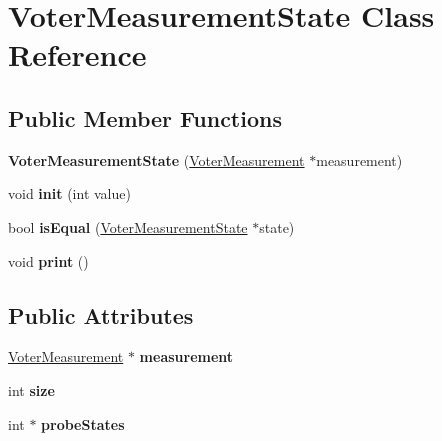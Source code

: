 \hypertarget{class_voter_measurement_state}{\section{Voter\-Measurement\-State Class Reference}
\label{class_voter_measurement_state}
}
\subsection*{Public Member Functions}
\begin{DoxyCompactItemize}
\item 
\hypertarget{class_voter_measurement_state_a35147598e984c9f124284ce82ef1c63a}{{\bfseries Voter\-Measurement\-State} (\hyperlink{class_voter_measurement}{Voter\-Measurement} $\ast$measurement)}\label{class_voter_measurement_state_a35147598e984c9f124284ce82ef1c63a}

\item 
\hypertarget{class_voter_measurement_state_a0e42569bb960b755395b5eec5b928014}{void {\bfseries init} (int value)}\label{class_voter_measurement_state_a0e42569bb960b755395b5eec5b928014}

\item 
\hypertarget{class_voter_measurement_state_ace14af99c55124ee7a4199c1f2d44b9c}{bool {\bfseries is\-Equal} (\hyperlink{class_voter_measurement_state}{Voter\-Measurement\-State} $\ast$state)}\label{class_voter_measurement_state_ace14af99c55124ee7a4199c1f2d44b9c}

\item 
\hypertarget{class_voter_measurement_state_aa40e89eeb334efa48cba9afaf8aec269}{void {\bfseries print} ()}\label{class_voter_measurement_state_aa40e89eeb334efa48cba9afaf8aec269}

\end{DoxyCompactItemize}
\subsection*{Public Attributes}
\begin{DoxyCompactItemize}
\item 
\hypertarget{class_voter_measurement_state_a7ed3e797dbf98eea1085610aa9b3b2f6}{\hyperlink{class_voter_measurement}{Voter\-Measurement} $\ast$ {\bfseries measurement}}\label{class_voter_measurement_state_a7ed3e797dbf98eea1085610aa9b3b2f6}

\item 
\hypertarget{class_voter_measurement_state_ae5df2d14e79f6bd4ebb4aafe158c86d3}{int {\bfseries size}}\label{class_voter_measurement_state_ae5df2d14e79f6bd4ebb4aafe158c86d3}

\item 
\hypertarget{class_voter_measurement_state_a89c38e09379dc56c7c9d16542f24a84f}{int $\ast$ {\bfseries probe\-States}}\label{class_voter_measurement_state_a89c38e09379dc56c7c9d16542f24a84f}

\end{DoxyCompactItemize}


